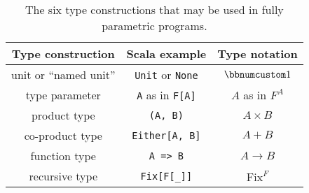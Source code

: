 \begin{table}
\begin{centering}
\begin{tabular}{|c|c|c|}
\hline 
\textbf{\small{}Type construction} & \textbf{\small{}Scala example} & \textbf{\small{}Type notation}\tabularnewline
\hline 
\hline 
{\small{}unit or \textsf{``}named unit\textsf{''}} & {\small{}}\lstinline!Unit!{\small{} or }\lstinline!None! & {\small{}$\bbnum 1$}\tabularnewline
\hline 
{\small{}type parameter} & {\small{}}\lstinline!A!{\small{} as in }\lstinline!F[A]! & {\small{}$A$ as in $F^{A}$}\tabularnewline
\hline 
{\small{}product type} & {\small{}}\lstinline!(A, B)! & {\small{}$A\times B$}\tabularnewline
\hline 
{\small{}co-product type} & {\small{}}\lstinline!Either[A, B]! & {\small{}$A+B$}\tabularnewline
\hline 
{\small{}function type} & {\small{}}\lstinline!A => B! & {\small{}$A\rightarrow B$}\tabularnewline
\hline 
{\small{}recursive type} & {\small{}}\lstinline!Fix[F[_]]! & {\small{}$\text{Fix}^{F}$}\tabularnewline
\hline 
\end{tabular}
\par\end{centering}
\caption{The six type constructions
that may be used in fully parametric programs.\label{tab:six-pure-type-constructions}}
\end{table}

